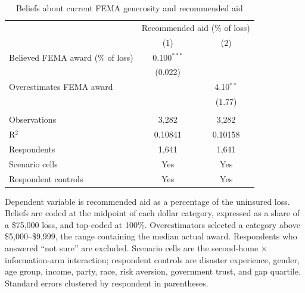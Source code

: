 
\begin{table}[htbp]
   \caption{\label{tab:fema_beliefs} Beliefs about current FEMA generosity and recommended aid}
   \bigskip
   \centering
   \begin{tabular}{lcc}
      \toprule
       & \multicolumn{2}{c}{Recommended aid (\% of loss)}\\
                                        & (1)           & (2)\\  
      \midrule 
      Believed FEMA award (\% of loss)  & 0.100$^{***}$ &   \\   
                                        & (0.022)       &   \\   
      Overestimates FEMA award          &               & 4.10$^{**}$\\   
                                        &               & (1.77)\\   
       \\
      Observations                      & 3,282         & 3,282\\  
      R$^2$                             & 0.10841       & 0.10158\\  
      Respondents                       & 1,641         & 1,641\\  
      Scenario cells                    & Yes           & Yes\\  
      Respondent controls               & Yes           & Yes\\  
      \bottomrule
   \end{tabular}
   
   \par \raggedright 
   Dependent variable is recommended aid as a percentage of the uninsured loss. Beliefs are coded at the midpoint of each dollar category, expressed as a share of a \$75,000 loss, and top-coded at 100\%. Overestimators selected a category above \$5,000--\$9,999, the range containing the median actual award. Respondents who answered ``not sure'' are excluded. Scenario cells are the second-home $\times$ information-arm interaction; respondent controls are disaster experience, gender, age group, income, party, race, risk aversion, government trust, and gap quartile. Standard errors clustered by respondent in parentheses.
\end{table}


